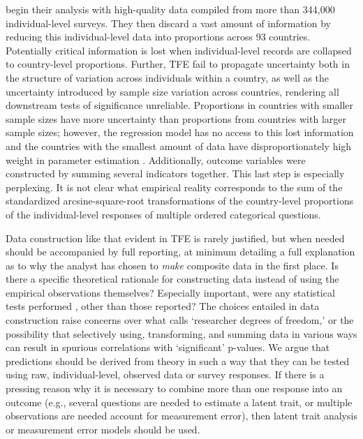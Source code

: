 \documentclass[12pt]{article}
\begin{document}
 \citet{Fincher2012} begin their analysis with high-quality data compiled from more than 344,000 individual-level surveys. They then discard a vast amount of information by reducing this individual-level data into proportions across 93 countries. Potentially critical information is lost when individual-level records are collapsed to country-level proportions. Further, TFE fail to propagate uncertainty both in the structure of variation across individuals within a country, as well as the uncertainty introduced by sample size variation across countries, rendering all downstream tests of significance unreliable.  Proportions in countries with smaller sample sizes have more uncertainty than proportions from countries with larger sample sizes; however, the regression model has no access to this lost information and the countries with the smallest amount of data have disproportionately high weight in parameter estimation \citep{McDonald2009}. Additionally, outcome variables were constructed by summing several indicators together. This last step is especially perplexing.  It is not clear what empirical reality corresponds to the sum of the standardized arcsine-square-root transformations of the country-level proportions of the individual-level responses of multiple ordered categorical questions.  

	Data construction like that evident in TFE is rarely justified, but when needed should be accompanied by full reporting, at minimum detailing a full explanation as to why the analyst has chosen to \textit{make} composite data in the first place.  Is there a specific theoretical rationale for constructing data instead of using the empirical observations themselves?  Especially important, were any statistical tests performed \citep[see][]{palmer1999detecting}, other than those reported?  The choices entailed in data construction raise concerns over what \citet{Gelman2013} calls `researcher degrees of freedom,' or the possibility that selectively using, transforming, and summing data in various ways can result in spurious correlations with `significant' p-values.  We argue that predictions should be derived from theory in such a way that they can be tested using raw, individual-level, observed data or survey responses.  If there is a pressing reason why it is necessary to combine more than one response into an outcome (e.g., several questions are needed to estimate a latent trait, or multiple observations are needed account for measurement error), then latent trait analysis or measurement error models should be used. 
\end{document}
